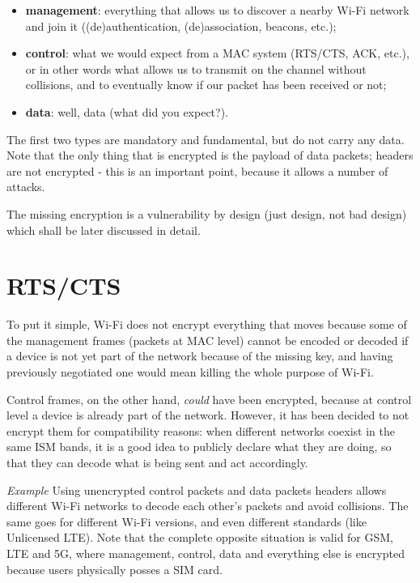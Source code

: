 \begin{itemize}
    \item \textbf{management}: everything that allows us to discover a nearby Wi-Fi network and join it ((de)authentication, (de)association, beacons, etc.);
    \item \textbf{control}:  what we would expect from a MAC system (RTS/CTS, ACK, etc.), or in other words what allows us to transmit on the channel without collisions, and to eventually know if our packet has been received or not;
    \item \textbf{data}: well, data (what did you expect?).
\end{itemize}
	
The first two types are mandatory and fundamental, but do not carry any data. Note that the only thing that is encrypted is the payload of data packets; headers are not encrypted - this is an important point, because it allows a number of attacks.

The missing encryption is a vulnerability by design (just design, not bad design) which shall be later discussed in detail.


\section{RTS/CTS}
To put it simple, Wi-Fi does not encrypt everything that moves because some of the management frames (packets at MAC level) cannot be encoded or decoded if a device is not yet part of the network because of the missing key, and having previously negotiated one would mean killing the whole purpose of Wi-Fi.

Control frames, on the other hand, \textit{could} have been encrypted, because at control level a device is already part of the network. However, it has been decided to not encrypt them for compatibility reasons: when different networks coexist in the same ISM bands, it is a good idea to publicly declare what they are doing, so that they can decode what is being sent and act accordingly.

\vspace{0.5em}

\emph{Example} Using unencrypted control packets and data packets headers allows different Wi-Fi networks to decode each other's packets and avoid collisions. The same goes for different Wi-Fi versions, and even different standards (like Unlicensed LTE). Note that the complete opposite situation is valid for GSM, LTE and 5G, where management, control, data and everything else is encrypted because users physically posses a SIM card.

